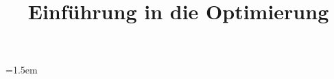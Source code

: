 \documentclass{mycourse}
\title{Einführung in die Optimierung}
\theoremstyle{mythm} 								%
\begin{document}
\emergencystretch=1.5em

\maketitle

\tableofcontents






\printbibliography
\end{document}
